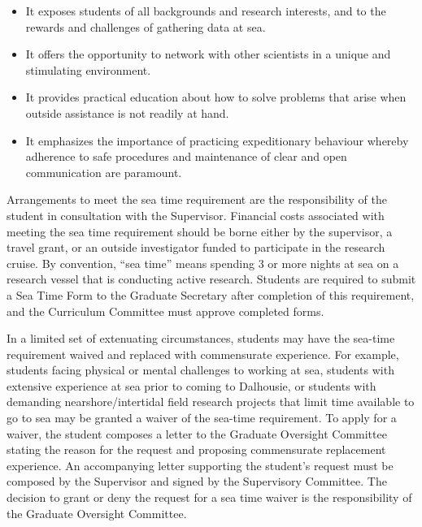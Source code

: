 \documentclass[12pt]{article}
\newcommand{\di}[1]{#1}
\newcommand{\parnum}{\arabic{parcount}}
\newcounter{parcount}
\newcommand\p{\stepcounter{parcount}\leavevmode{\raisebox{0.2ex}{\scriptsize[\parnum]}}\hspace{0.2em}}
\newcommand{\supervisor}{Supervisor\xspace}
\newcommand{\curcom}{Curriculum Committee\xspace}
\newcommand{\supcom}{Supervisory Committee\xspace}
\newcommand{\gocom}{Graduate Oversight Committee\xspace}
\newcommand{\GS}{Graduate Secretary\xspace}
\newcommand{\formST}{Sea Time Form\xspace}
\begin{document}
\begin{itemize}

    \item It exposes students of all backgrounds and research interests,
        and to the rewards and challenges of gathering data at sea.

    \item It offers the opportunity to network with other scientists in a
        unique and stimulating environment.

    \item It provides practical education about how to solve problems that
        arise when outside assistance is not readily at hand.

    \item It emphasizes the importance of practicing expeditionary behaviour
        whereby adherence to safe procedures and maintenance of clear and open
        communication are paramount.

\end{itemize}

\p Arrangements to meet the \di{sea time} requirement are the responsibility of
the student in consultation with the \supervisor. Financial costs associated
with meeting the \di{sea time} requirement should be borne either by the
supervisor, a travel grant, or an outside investigator funded to participate in
the research cruise. By convention, ``sea time'' means spending 3 or more
nights at sea on a research vessel that is conducting active research. Students
are required to submit a \formST to the \GS after completion of this
requirement, and the \curcom must approve completed forms.

\p In a limited set of extenuating circumstances, students may have the
sea-time requirement waived and replaced with commensurate experience. For
example, students facing physical or mental challenges to working at sea,
students with extensive experience at sea prior to coming to Dalhousie, or
students with demanding nearshore/intertidal field research projects that limit
time available to go to sea may be granted a waiver of the sea-time
requirement. To apply for a waiver, the student composes a letter to the
\gocom stating the reason for the request and proposing commensurate
replacement experience. An accompanying letter supporting the student's request
must be composed by the \supervisor and signed by the \supcom. The
decision to grant or deny the request for a sea time waiver is the
responsibility of the \gocom.
\end{document}

